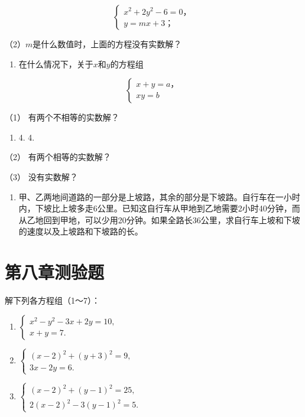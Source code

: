 \[
\left\{ \begin{array}{l} x ^ {2} + 2 y ^ {2} - 6 = 0\text{，} \\ y = m x + 3\text{；} \end{array} \right.
\]

（2）\(m\)是什么数值时，上面的方程没有实数解？

\begin{enumerate}[start=9]
\item
  在什么情况下，关于\(x\)和\(y\)的方程组
\end{enumerate}

\[
\left\{ \begin{array}{l} x + y = a\text{，} \\ x y = b \end{array} \right.
\]

（1） 有两个不相等的实数解？

\begin{enumerate}[start=4]
\item
  4. 4.
\end{enumerate}

（2） 有两个相等的实数解？

（3） 没有实数解？

\begin{enumerate}[start=10]
\item
  甲、乙两地间道路的一部分是上坡路，其余的部分是下坡路。自行车在一小时内，下坡比上坡多走6公里。已知这自行车从甲地到乙地需要2小时40分钟，而从乙地回到甲地，可以少用20分钟。如果全路长36公里，求自行车上坡和下坡的速度以及上坡路和下坡路的长。
\end{enumerate}

\section{第八章测验题}

解下列各方程组（1～7）：

\begin{enumerate}[start=1]
\item
  \(\left\{ \begin{array}{l} x^{2} - y^{2} - 3x + 2y = 10, \\ x + y = 7. \end{array} \right.\)
\item
  \(\left\{ \begin{array}{l} (x - 2)^{2} + (y + 3)^{2} = 9, \\ 3x - 2y = 6. \end{array} \right.\)
\item
  \(\left\{ \begin{array}{l} (x - 2)^{2} + (y - 1)^{2} = 25, \\ 2(x - 2)^{2} - 3(y - 1)^{2} = 5. \end{array} \right.\)
\end{enumerate}

